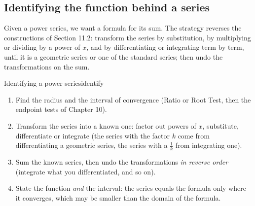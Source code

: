\documentclass[11pt]{article}
\begin{document}
\subsection*{Identifying the function behind a series}

Given a power series, we want a formula for its sum. The strategy reverses the constructions of Section 11.2: transform the series by substitution, by multiplying or dividing by a power of $x$, and by differentiating or integrating term by term, until it is a geometric series or one of the standard series; then undo the transformations on the sum.

\begin{proc}{Identifying a power series}{identify}
\begin{enumerate}[nosep]
  \item Find the radius and the interval of convergence (Ratio or Root Test, then the endpoint tests of Chapter 10).
  \item Transform the series into a known one: factor out powers of $x$, substitute, differentiate or integrate (the series with the factor $k$ come from differentiating a geometric series, the series with a $\frac1k$ from integrating one).
  \item Sum the known series, then undo the transformations \emph{in reverse order} (integrate what you differentiated, and so on).
  \item State the function \emph{and} the interval: the series equals the formula only where it converges, which may be smaller than the domain of the formula.
\end{enumerate}
\end{proc}
\end{document}
